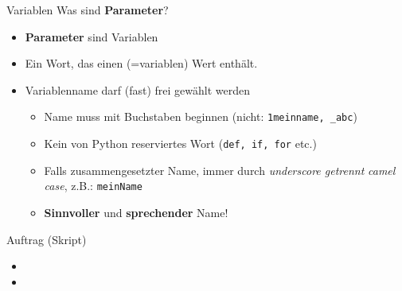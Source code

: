 \begin{frame}[fragile]{Variablen}
Was sind \textbf{Parameter}?
\begin{itemize}[<+->]
\item \textbf{Parameter} sind Variablen
\item Ein Wort, das einen  (=variablen) Wert enthält.
\item Variablenname darf (fast) frei gewählt werden
\begin{itemize}
\item Name muss mit Buchstaben beginnen (nicht: \verb|1meinname, _abc|)
\item Kein von Python reserviertes Wort (\lstinline|def, if, for| etc.)
\item Falls zusammengesetzter Name, immer durch \textit{underscore getrennt } \textit{camel case}, z.B.: \lstinline|meinName|
\item \textbf{Sinnvoller} und \textbf{sprechender} Name!
\end{itemize}
\end{itemize}
\end{frame}


\begin{frame}[fragile]{Auftrag (Skript)}
\begin{itemize}
\item {}
\item {}
\end{itemize}

\end{frame}
